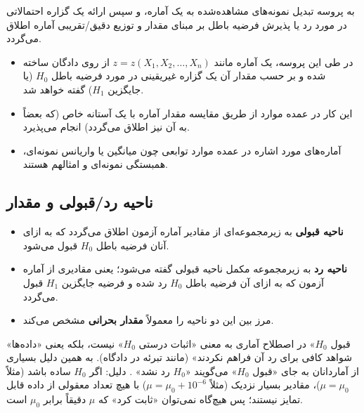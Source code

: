 \begin{definition}
به پروسه تبدیل نمونه‌های مشاهده‌شده به یک آماره، و سپس ارائه یک گزاره احتمالاتی در مورد رد یا پذیرش فرضیه باطل بر مبنای مقدار و توزیع دقیق/تقریبی آماره اطلاق می‌گردد.
\end{definition}
\begin{itemize}
\item در طی این پروسه، یک آماره مانند $z=z(X_1,X_2,\ldots,X_n)$ از روی دادگان ساخته شده و بر حسب مقدار آن یک گزاره غیریقینی در مورد فرضیه باطل $H_0$ (یا جایگزین $H_1$) گفته خواهد شد.
\item این کار در عمده موارد از طریق مقایسه مقدار آماره با یک آستانه خاص (که بعضاً به آن  نیز اطلاق می‌گردد) انجام می‌پذیرد.
\item آماره‌های مورد اشاره در عمده موارد توابعی چون میانگین یا واریانس نمونه‌ای، همبستگی نمونه‌ای و امثالهم هستند.
\end{itemize}

\subsection{ناحیه رد/قبولی و مقدار }
\begin{definition}
\begin{itemize}
\item \textbf{ناحیه قبولی } به زیرمجموعه‌ای از مقادیر آماره آزمون اطلاق می‌گردد که به ازای آنان فرضیه باطل $H_0$ قبول می‌شود.
\item \textbf{ناحیه رد } به زیرمجموعه مکمل ناحیه قبولی گفته می‌شود؛ یعنی مقادیری از آماره آزمون که به ازای آن فرضیه باطل $H_0$ رد شده و فرضیه جایگزین $H_1$ قبول می‌گردد.
\item مرز بین این دو ناحیه را معمولاً \textbf{مقدار بحرانی } مشخص می‌کند.
\end{itemize}
\end{definition}

\begin{warning}
\warntitle «قبول $H_0$» در اصطلاح آماری به معنی «اثبات درستی $H_0$» نیست، بلکه یعنی «داده‌ها شواهد کافی برای رد آن فراهم نکردند» (مانند تبرئه در دادگاه). به همین دلیل بسیاری از آماردانان به جای «قبول $H_0$» می‌گویند «$H_0$ رد نشد» . دلیل: اگر $H_0$ ساده باشد (مثلاً $\mu=\mu_0$)، مقادیر بسیار نزدیک (مثلاً $\mu=\mu_0+10^{-6}$) با هیچ تعداد معقولی از داده قابل تمایز نیستند؛ پس هیچ‌گاه نمی‌توان «ثابت کرد» که $\mu$ دقیقاً برابر $\mu_0$ است.
\end{warning}

